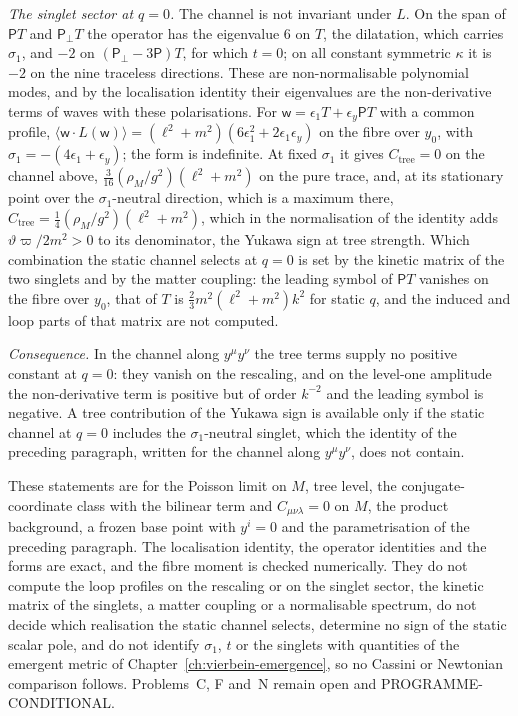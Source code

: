 \emph{The singlet sector at \(q=0\).} The channel is not invariant under \(L\). On the span of \(\mathsf PT\) and \(\mathsf P_\perp T\) the operator has the eigenvalue \(6\) on \(T\), the dilatation, which carries \(\sigma_1\), and \(-2\) on \((\mathsf P_\perp-3\mathsf P)T\), for which \(t=0\); on all constant symmetric \(\kappa\) it is \(-2\) on the nine traceless directions. These are non-normalisable polynomial modes, and by the localisation identity their eigenvalues are the non-derivative terms of waves with these polarisations. For \(\mathsf w=\epsilon_1T+\epsilon_y\mathsf PT\) with a common profile, \(\langle\mathsf w\cdot L(\mathsf w)\rangle=(\ell^2+m^2)(6\epsilon_1^2+2\epsilon_1\epsilon_y)\) on the fibre over \(y_0\), with \(\sigma_1=-(4\epsilon_1+\epsilon_y)\); the form is indefinite. At fixed \(\sigma_1\) it gives \(C_{\mathrm{tree}}=0\) on the channel above, \(\tfrac3{16}(\rho_M/g^2)(\ell^2+m^2)\) on the pure trace, and, at its stationary point over the \(\sigma_1\)-neutral direction, which is a maximum there, \(C_{\mathrm{tree}}=\tfrac14(\rho_M/g^2)(\ell^2+m^2)\), which in the normalisation of the identity adds \(\vartheta\varpi/2m^2>0\) to its denominator, the Yukawa sign at tree strength. Which combination the static channel selects at \(q=0\) is set by the kinetic matrix of the two singlets and by the matter coupling: the leading symbol of \(\mathsf PT\) vanishes on the fibre over \(y_0\), that of \(T\) is \(\tfrac23m^2(\ell^2+m^2)k^2\) for static \(q\), and the induced and loop parts of that matrix are not computed.

\emph{Consequence.} In the channel along \(y^\mu y^\nu\) the tree terms supply no positive constant at \(q=0\): they vanish on the rescaling, and on the level-one amplitude the non-derivative term is positive but of order \(k^{-2}\) and the leading symbol is negative. A tree contribution of the Yukawa sign is available only if the static channel at \(q=0\) includes the \(\sigma_1\)-neutral singlet, which the identity of the preceding paragraph, written for the channel along \(y^\mu y^\nu\), does not contain.

These statements are for the Poisson limit on \(M\), tree level, the conjugate-coordinate class with the bilinear term and \(C_{\mu\nu\lambda}=0\) on \(M\), the product background, a frozen base point with \(y^i=0\) and the parametrisation of the preceding paragraph. The localisation identity, the operator identities and the forms are exact, and the fibre moment is checked numerically. They do not compute the loop profiles on the rescaling or on the singlet sector, the kinetic matrix of the singlets, a matter coupling or a normalisable spectrum, do not decide which realisation the static channel selects, determine no sign of the static scalar pole, and do not identify \(\sigma_1\), \(t\) or the singlets with quantities of the emergent metric of Chapter~\ref{ch:vierbein-emergence}, so no Cassini or Newtonian comparison follows. Problems~C, F and~N remain open and PROGRAMME-CONDITIONAL.

